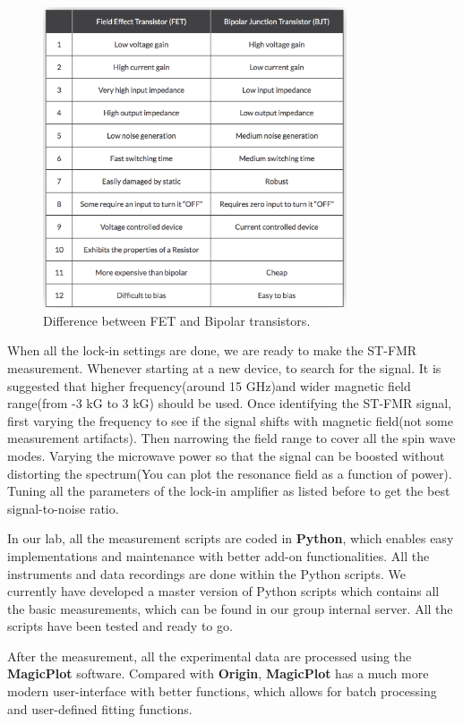 \begin{figure}[h]
  \centering
  \includegraphics[width=0.8\textwidth]{fig/appendix/transistor.png}
  \caption{Difference between FET and Bipolar transistors\cite{Transistor}.}
  \label{fig:transistor}
\end{figure}

When all the lock-in settings are done, we are ready to make the ST-FMR measurement. Whenever starting at a new device, to search for the signal. It is suggested that higher frequency(around 15 GHz)and wider magnetic field range(from -3 kG to 3 kG) should be used. Once identifying the ST-FMR signal, first varying the frequency to see if the signal shifts with magnetic field(not some measurement artifacts). Then narrowing the field range to cover all the spin wave modes. Varying the microwave power so that the signal can be boosted without distorting the spectrum(You can plot the resonance field as a function of power). Tuning all the parameters of the lock-in amplifier as listed before to get the best signal-to-noise ratio.

In our lab, all the measurement scripts are coded in \textbf{Python}, which enables easy implementations and maintenance with better add-on functionalities. All the instruments and data recordings are done within the Python scripts. We currently have developed a master version of Python scripts which contains all the basic measurements, which can be found in our group internal server. All the scripts have been tested and ready to go.

After the measurement, all the experimental data are processed using the \textbf{MagicPlot} software. Compared with \textbf{Origin}, \textbf{MagicPlot} has a much more modern user-interface with better functions, which allows for batch processing and user-defined fitting functions.

